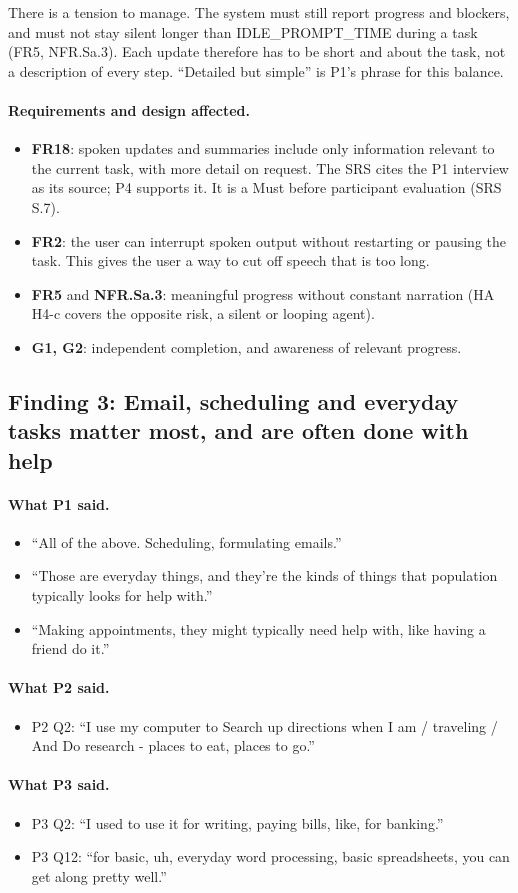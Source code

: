 \documentclass[12pt, titlepage]{article}
\newcommand{\said}{\paragraph{What P1 said.}}
\newcommand{\saidtwo}{\paragraph{What P2 said.}}
\newcommand{\saidthree}{\paragraph{What P3 said.}}
\newcommand{\affects}{\paragraph{Requirements and design affected.}}
\begin{document}
There is a tension to manage. The system must still report progress and blockers, and must not stay silent longer than IDLE\_PROMPT\_TIME during a task (FR5, NFR.Sa.3). Each update therefore has to be short and about the task, not a description of every step. ``Detailed but simple'' is P1's phrase for this balance.

\affects
\begin{itemize}
    \item \textbf{FR18}: spoken updates and summaries include only information relevant to the current task, with more detail on request. The SRS cites the P1 interview as its source; P4 supports it. It is a Must before participant evaluation (SRS S.7).
    \item \textbf{FR2}: the user can interrupt spoken output without restarting or pausing the task. This gives the user a way to cut off speech that is too long.
    \item \textbf{FR5} and \textbf{NFR.Sa.3}: meaningful progress without constant narration (HA H4-c covers the opposite risk, a silent or looping agent).
    \item \textbf{G1, G2}: independent completion, and awareness of relevant progress.
\end{itemize}

\subsection{Finding 3: Email, scheduling and everyday tasks matter most, and are often done with help}

\said
\begin{itemize}
    \item ``All of the above. Scheduling, formulating emails.''
    \item ``Those are everyday things, and they're the kinds of things that population typically looks for help with.''
    \item ``Making appointments, they might typically need help with, like having a friend do it.''
\end{itemize}

\saidtwo
\begin{itemize}
    \item P2 Q2: ``I use my computer to Search up directions when I am / traveling / And Do research - places to eat, places to go.''
\end{itemize}

\saidthree
\begin{itemize}
    \item P3 Q2: ``I used to use it for writing, paying bills, like, for banking.''
    \item P3 Q12: ``for basic, uh, everyday word processing, basic spreadsheets, you can get along pretty well.''
\end{itemize}
\end{document}
